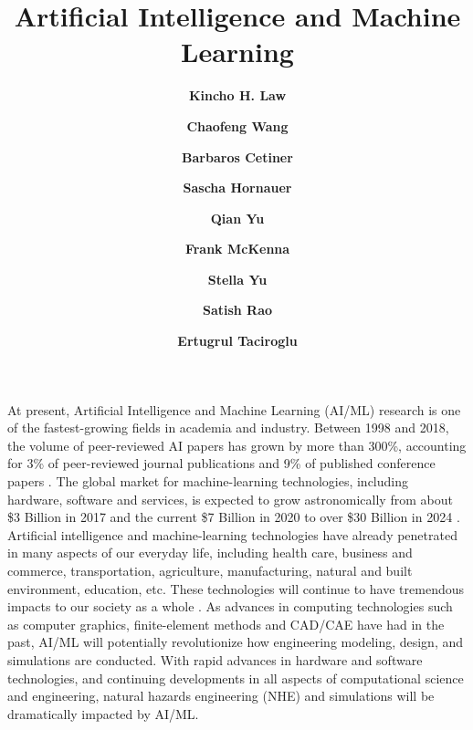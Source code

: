 %
%
%


\title{Artificial Intelligence and Machine Learning}
\author{
    \textbf{Kincho H. Law}
    \and \textbf{Chaofeng Wang}
    \and \textbf{Barbaros Cetiner}
    \and \textbf{Sascha Hornauer}
    \and \textbf{Qian Yu}
    \and \textbf{Frank McKenna}
    \and \textbf{Stella Yu}
    \and \textbf{Satish Rao}
    \and \textbf{Ertugrul Taciroglu}}
\tocauthor{}
%
%
\maketitle
\label{chapter:cc_aiml}

At present, Artificial Intelligence and Machine Learning (AI/ML) research is one of the fastest-growing fields in academia and industry. Between 1998 and 2018, the volume of peer-reviewed AI papers has grown by more than 300\%, accounting for 3\% of peer-reviewed journal publications and 9\% of published conference papers \citep{perrault2019ai}. The global market for machine-learning technologies, including hardware, software and services, is expected to grow astronomically from about \$3 Billion in 2017 and the current \$7 Billion in 2020 to over \$30 Billion in 2024 \citep{mrf2019machine}. Artificial intelligence and machine-learning technologies have already penetrated in many aspects of our everyday life, including health care, business and commerce, transportation, agriculture, manufacturing, natural and built environment, education, etc. These technologies will continue to have tremendous impacts to our society as a whole \citep{nstc2016preparing, nstc2016national, nstc2019national}. As advances in computing technologies such as computer graphics, finite-element methods and CAD/CAE have had in the past, AI/ML will potentially revolutionize how engineering modeling, design, and simulations are conducted. With rapid advances in hardware and software technologies, and continuing developments in all aspects of computational science and engineering, natural hazards engineering (NHE) and simulations will be dramatically impacted by AI/ML.

